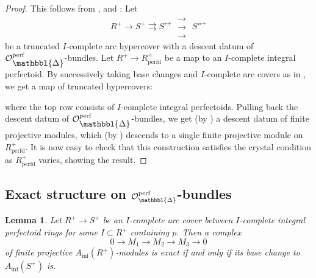 \documentclass[10pt,twoside]{article}
\numberwithin{equation}{section}
\theoremstyle{plain}
\newtheorem{mylemma}[mythm]{Lemma}
\theoremstyle{definition}
\DeclareMathOperator{\perfd}{perfd}
\newcommand{\MCO}{\mathcal{O}}
\DeclareMathOperator{\perf}{perf}
\newcommand{\Prism}{{\mathlarger{\mathbbl{\Delta}}}}
\DeclareMathOperator{\Inf}{inf}
\newcommand{\Ainf}{A_{\Inf}}
\newcommand{\OpP}{\MCO^{\perf}_{\Prism}}
\newcommand{\rrrarrows}{\;\substack{\rightarrow\\[-1em] \rightarrow \\[-1em] \rightarrow}\;}
\begin{document}
\begin{proof}
    This follows from ,  and : Let 
    \[R^+\longrightarrow S^+\rightrightarrows S'^+   \rrrarrows  S''^+\]
    be a truncated \(I\)-complete arc hypercover with a descent datum of \(\OpP\)-bundles. Let \(R^+\to R^{+}_{\perfd}\) be a map to an \(I\)-complete integral perfectoid. By successively taking base changes and \(I\)-complete arc covers as in , we get a map of truncated hypercovers:
    \begin{center}
    \end{center}
where the top row consists of \(I\)-complete integral perfectoids. Pulling back the descent datum of \(\OpP\)-bundles, we get (by ) a descent datum of finite projective modules, which (by ) descends to a single finite projective module on \(R^+_{\perfd}\). It is now easy to check that this construction satisfies the crystal condition as \(R^+_{\perfd}\) varies, showing the result.
\end{proof}
\subsection{\texorpdfstring{Exact structure on \(\MCO^{\perf}_{\mathbbl{\Delta}}\)-bundles}
  {Exact structure on OΔperf-bundles}}
\begin{mylemma}\label{exactnessArcLocally}
    Let \(R^+\to S^+\) be an \(I\)-complete arc cover between \(I\)-complete integral perfectoid rings for some \(I\subset R^+\) containing \(p\). Then a complex
    \[0\longrightarrow M_1\longrightarrow M_2\longrightarrow M_3\longrightarrow0\]
    of finite projective \(\Ainf(R^+)\)-modules is exact if and only if its base change to \(\Ainf(S^+)\) is.
\end{mylemma}
\end{document}
